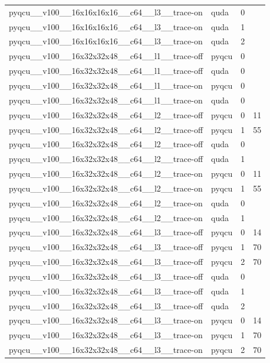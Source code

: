 \begin{table}[htbp]
\begin{tabular}{@{}llrr@{}}
pyqcu\_\_v100\_\_16x16x16x16\_\_c64\_\_l3\_\_trace-on & quda & 0 &  \\
pyqcu\_\_v100\_\_16x16x16x16\_\_c64\_\_l3\_\_trace-on & quda & 1 &  \\
pyqcu\_\_v100\_\_16x16x16x16\_\_c64\_\_l3\_\_trace-on & quda & 2 &  \\
pyqcu\_\_v100\_\_16x32x32x48\_\_c64\_\_l1\_\_trace-off & pyqcu & 0 &  \\
pyqcu\_\_v100\_\_16x32x32x48\_\_c64\_\_l1\_\_trace-off & quda & 0 &  \\
pyqcu\_\_v100\_\_16x32x32x48\_\_c64\_\_l1\_\_trace-on & pyqcu & 0 &  \\
pyqcu\_\_v100\_\_16x32x32x48\_\_c64\_\_l1\_\_trace-on & quda & 0 &  \\
pyqcu\_\_v100\_\_16x32x32x48\_\_c64\_\_l2\_\_trace-off & pyqcu & 0 & 11 \\
pyqcu\_\_v100\_\_16x32x32x48\_\_c64\_\_l2\_\_trace-off & pyqcu & 1 & 55 \\
pyqcu\_\_v100\_\_16x32x32x48\_\_c64\_\_l2\_\_trace-off & quda & 0 &  \\
pyqcu\_\_v100\_\_16x32x32x48\_\_c64\_\_l2\_\_trace-off & quda & 1 &  \\
pyqcu\_\_v100\_\_16x32x32x48\_\_c64\_\_l2\_\_trace-on & pyqcu & 0 & 11 \\
pyqcu\_\_v100\_\_16x32x32x48\_\_c64\_\_l2\_\_trace-on & pyqcu & 1 & 55 \\
pyqcu\_\_v100\_\_16x32x32x48\_\_c64\_\_l2\_\_trace-on & quda & 0 &  \\
pyqcu\_\_v100\_\_16x32x32x48\_\_c64\_\_l2\_\_trace-on & quda & 1 &  \\
pyqcu\_\_v100\_\_16x32x32x48\_\_c64\_\_l3\_\_trace-off & pyqcu & 0 & 14 \\
pyqcu\_\_v100\_\_16x32x32x48\_\_c64\_\_l3\_\_trace-off & pyqcu & 1 & 70 \\
pyqcu\_\_v100\_\_16x32x32x48\_\_c64\_\_l3\_\_trace-off & pyqcu & 2 & 70 \\
pyqcu\_\_v100\_\_16x32x32x48\_\_c64\_\_l3\_\_trace-off & quda & 0 &  \\
pyqcu\_\_v100\_\_16x32x32x48\_\_c64\_\_l3\_\_trace-off & quda & 1 &  \\
pyqcu\_\_v100\_\_16x32x32x48\_\_c64\_\_l3\_\_trace-off & quda & 2 &  \\
pyqcu\_\_v100\_\_16x32x32x48\_\_c64\_\_l3\_\_trace-on & pyqcu & 0 & 14 \\
pyqcu\_\_v100\_\_16x32x32x48\_\_c64\_\_l3\_\_trace-on & pyqcu & 1 & 70 \\
pyqcu\_\_v100\_\_16x32x32x48\_\_c64\_\_l3\_\_trace-on & pyqcu & 2 & 70 \\

\end{tabular}
\end{table}
